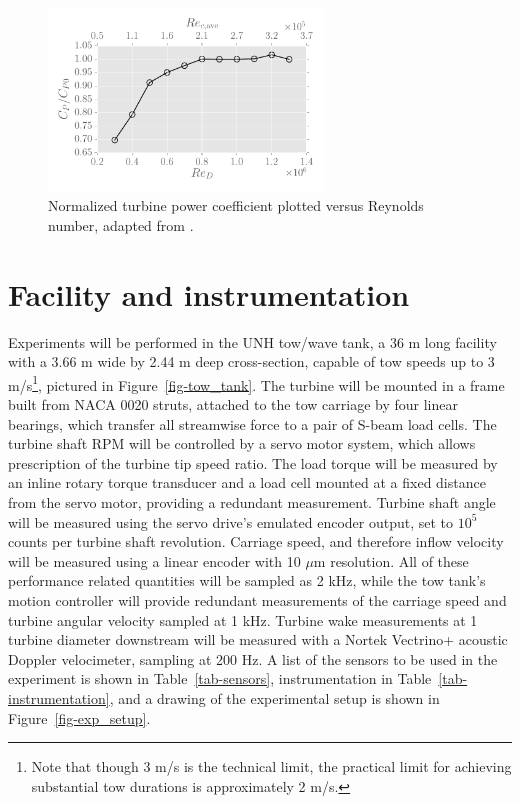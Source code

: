 \documentclass[12pt,letterpaper]{scrreprt}
\begin{document}
\begin{figure}[ht]
\centering
\includegraphics[width=0.65\textwidth]{Figures/re_dep_cp.pdf}
\caption{Normalized turbine power coefficient plotted versus Reynolds number, adapted from \cite{Bachant2014}.}
\label{fig-cp_re_dep}
\end{figure}

\section{Facility and instrumentation}

Experiments will be performed in the UNH tow/wave tank, a 36 m long facility
with a 3.66 m wide by 2.44 m deep cross-section, capable of tow speeds up to 3
m/s\footnote{Note that though 3 m/s is the technical limit, the practical limit
for achieving substantial tow durations is approximately 2 m/s.}, pictured in
Figure~\ref{fig-tow_tank}. The turbine will be mounted in a frame built from
NACA 0020 struts, attached to the tow carriage by four linear bearings, which
transfer all streamwise force to a pair of S-beam load cells. The turbine shaft
RPM will be controlled by a servo motor system, which allows prescription of the
turbine tip speed ratio. The load torque will be measured by an inline rotary
torque transducer and a load cell mounted at a fixed distance from the servo
motor, providing a redundant measurement. Turbine shaft angle will be measured
using the servo drive's emulated encoder output, set to $10^5$ counts per
turbine shaft revolution. Carriage speed, and therefore inflow velocity will be
measured using a linear encoder with 10 $\mu$m resolution. All of these
performance related quantities will be sampled as 2 kHz, while the tow tank's
motion controller will provide redundant measurements of the carriage speed and
turbine angular velocity sampled at 1 kHz. Turbine wake measurements at 1
turbine diameter downstream will be measured with a Nortek Vectrino+ acoustic
Doppler velocimeter, sampling at 200 Hz. A list of the sensors to be used in the
experiment is shown in Table~\ref{tab-sensors}, instrumentation in
Table~\ref{tab-instrumentation}, and a drawing of the experimental setup is
shown in Figure~\ref{fig-exp_setup}.
\end{document}
